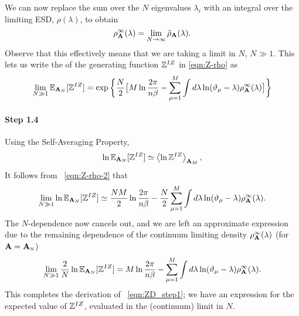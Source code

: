 We can now replace
the sum over the $N$ eigenvalues $\lambda_{i}$ with an integral over the limiting
ESD, $\rho(\lambda)$, to obtain
\begin{equation}
\label{eqn:rho-}
\rho^{\infty}_{\AMAT}(\lambda)=    \lim_{N\rightarrow\infty}\tilde\rho_{\AMAT}(\lambda)  .
\end{equation}
Observe that this effectively means that we are taking a \LargeN limit in $N$, $N\gg 1$.
%
This lets us write the \ExpectedValue of the generating function $\ZD$
in \ref{eqn:Z-rho}
as
\begin{equation}
\label{eqn:Z-rho-2}
    \lim_{N\gg 1}\EZDATWO=\exp\bigg\{\dfrac{N}{2}\big[M\ln\dfrac{2\pi}{\ND\beta}-
    \sum_{\mu=1}^{M}\int
        d\lambda\ln(\DeltaMu-\lambda)\rho^{\infty}_{\AMAT}(\lambda)\big]\bigg\}
\end{equation}

\paragraph{Step 1.4}
Using the Self-Averaging Property,
\begin{equation}
   \ln \EZDATWO \simeq \Expected[\mathbf{A}_M]{\ln \ZD} ,
\end{equation}
It follows from \EQN~\ref{eqn:Z-rho-2}
that
\begin{equation}
   \lim_{N\gg 1} \ln \EZDATWO
   \simeq \dfrac{N M}{2}\ln\dfrac{2\pi}{\ND\beta}
         -\dfrac{N}{2}\sum_{\mu=1}^{M}\int d\lambda\ln(\DeltaMu-\lambda)\rho^{\infty}_{\AMAT}(\lambda)  .
\end{equation}
%
The $N$-dependence now cancels out,
and we are left an approximate expression due to the remaining dependence of the continuum limiting density
$\rho^{\infty}_{\AMAT}(\lambda)$ (for $\AMAT=\AMATN$)
%
\begin{equation}
\label{eqn:ln-Z-Nlim2}
    \lim_{N \gg 1}\dfrac{2}{N}\ln \EZDATWO
    = M\ln\dfrac{2\pi}{\ND\beta}-\sum_{\mu=1}^{M}\int d\lambda\ln(\DeltaMu-\lambda)\rho^{\infty}_{\AMAT}(\lambda)  .
\end{equation}
This completes the derivation of \EQN~\ref{eqn:ZD_step1}; 
we have an expression for the expected value of $\ZD$,
evaluated in the \LargeN (continuum) limit in $N$.

